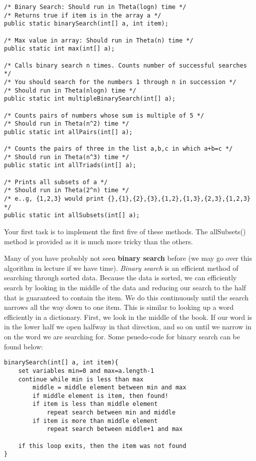 \documentclass[paper=a4, fontsize=11pt, parskip=full]{scrartcl} %
\numberwithin{equation}{section} %
\numberwithin{figure}{section} %
\numberwithin{table}{section} %
\begin{document}
\begin{lstlisting}
/* Binary Search: Should run in Theta(logn) time */
/* Returns true if item is in the array a */
public static binarySearch(int[] a, int item);

/* Max value in array: Should run in Theta(n) time */
public static int max(int[] a);

/* Calls binary search n times. Counts number of successful searches */
/* You should search for the numbers 1 through n in succession */
/* Should run in Theta(nlogn) time */
public static int multipleBinarySearch(int[] a);

/* Counts pairs of numbers whose sum is multiple of 5 */
/* Should run in Theta(n^2) time */
public static int allPairs(int[] a);

/* Counts the pairs of three in the list a,b,c in which a+b=c */
/* Should run in Theta(n^3) time */
public static int allTriads(int[] a);

/* Prints all subsets of a */
/* Should run in Theta(2^n) time */
/* e..g, {1,2,3} would print {},{1},{2},{3},{1,2},{1,3},{2,3},{1,2,3} */
public static int allSubsets(int[] a);
\end{lstlisting}

Your first task is to implement the first five of these methods. The allSubsets() method is provided as it is much more tricky than the others.

Many of you have probably not seen \textbf{binary search} before (we may go over this algorithm in lecture if we have time). \emph{Binary search} is an efficient method of searching through sorted data. Because the data is sorted, we can efficiently search by looking in the middle of the data and reducing our search to the half that is guaranteed to contain the item. We do this continuously until the search narrows all the way down to one item. This is similar to looking up a word efficiently in a dictionary. First, we look in the middle of the book. If our word is in the lower half we open halfway in that direction, and so on until we narrow in on the word we are searching for. Some psuedo-code for binary search can be found below:

\begin{lstlisting}
binarySearch(int[] a, int item){
	set variables min=0 and max=a.length-1
	continue while min is less than max
		middle = middle element between min and max
		if middle element is item, then found!
		if item is less than middle element
			repeat search between min and middle
		if item is more than middle element
			repeat search between middle+1 and max

	if this loop exits, then the item was not found
}
\end{lstlisting}
\end{document}
